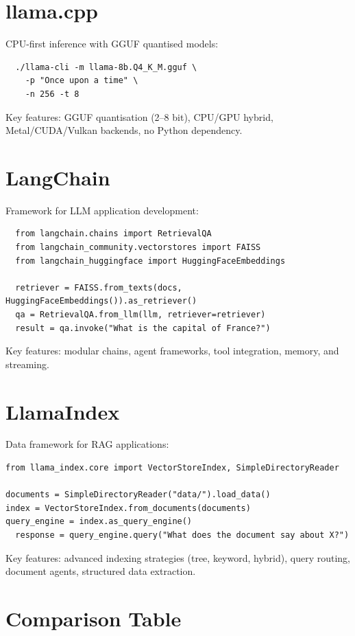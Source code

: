 \documentclass[11pt,a4paper]{book}
\theoremstyle{definition}
\begin{document}
\section{llama.cpp}

CPU-first inference with GGUF quantised models:
\begin{lstlisting}
  ./llama-cli -m llama-8b.Q4_K_M.gguf \
    -p "Once upon a time" \
    -n 256 -t 8
\end{lstlisting}

Key features: GGUF quantisation (2--8 bit), CPU/GPU hybrid, Metal/CUDA/Vulkan backends, no Python dependency.

\section{LangChain}

Framework for LLM application development:
\begin{lstlisting}
  from langchain.chains import RetrievalQA
  from langchain_community.vectorstores import FAISS
  from langchain_huggingface import HuggingFaceEmbeddings

  retriever = FAISS.from_texts(docs, HuggingFaceEmbeddings()).as_retriever()
  qa = RetrievalQA.from_llm(llm, retriever=retriever)
  result = qa.invoke("What is the capital of France?")
\end{lstlisting}

Key features: modular chains, agent frameworks, tool integration, memory, and streaming.

\section{LlamaIndex}

Data framework for RAG applications:
\begin{lstlisting}
from llama_index.core import VectorStoreIndex, SimpleDirectoryReader

documents = SimpleDirectoryReader("data/").load_data()
index = VectorStoreIndex.from_documents(documents)
query_engine = index.as_query_engine()
  response = query_engine.query("What does the document say about X?")
\end{lstlisting}

Key features: advanced indexing strategies (tree, keyword, hybrid), query routing, document agents, structured data extraction.

\section{Comparison Table}
\end{document}

